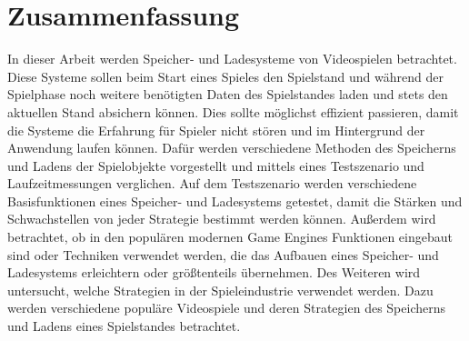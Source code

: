 \chapter*{Zusammenfassung}


In dieser Arbeit werden Speicher- und Ladesysteme von Videospielen betrachtet. Diese Systeme sollen beim Start eines Spieles den Spielstand und während der Spielphase noch weitere benötigten Daten des Spielstandes laden und stets den aktuellen Stand absichern können. Dies sollte möglichst effizient passieren, damit die Systeme die Erfahrung für Spieler nicht stören und im Hintergrund der Anwendung laufen können. Dafür werden verschiedene Methoden des Speicherns und Ladens der Spielobjekte vorgestellt und mittels eines Testszenario und Laufzeitmessungen verglichen. Auf dem Testszenario werden verschiedene Basisfunktionen eines Speicher- und Ladesystems getestet, damit die Stärken und Schwachstellen von jeder Strategie bestimmt werden können. Außerdem wird betrachtet, ob in den populären modernen Game Engines Funktionen eingebaut sind oder Techniken verwendet werden, die das Aufbauen eines Speicher- und Ladesystems erleichtern oder größtenteils übernehmen. Des Weiteren wird untersucht, welche Strategien in der Spieleindustrie verwendet werden. Dazu werden verschiedene populäre Videospiele und deren Strategien des Speicherns und Ladens eines Spielstandes betrachtet.
